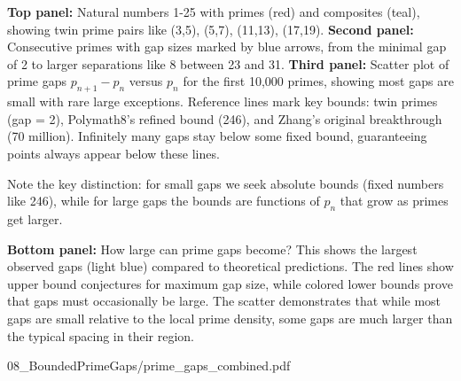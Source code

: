 \begin{SideNotePage}{

  \textbf{Top panel:} Natural numbers 1-25 with primes (red) and composites (teal), showing twin prime pairs like (3,5), (5,7), (11,13), (17,19).
  \newline
  \textbf{Second panel:} Consecutive primes with gap sizes marked by blue arrows, from the minimal gap of 2 to larger separations like 8 between 23 and 31.
  \newline
  \textbf{Third panel:} Scatter plot of prime gaps $p_{n+1} - p_n$ versus $p_n$ for the first 10,000 primes, showing most gaps are small with rare large exceptions. Reference lines mark key bounds: twin primes (gap = 2), Polymath8's refined bound (246), and Zhang's original breakthrough (70 million). Infinitely many gaps stay below some fixed bound, guaranteeing points always appear below these lines.
  
  Note the key distinction: for small gaps we seek absolute bounds (fixed numbers like 246), while for large gaps the bounds are functions of $p_n$ that grow as primes get larger.
  
  \textbf{Bottom panel:} How large can prime gaps become? This shows the largest observed gaps (light blue) compared to theoretical predictions. The red lines show upper bound conjectures for maximum gap size, while colored lower bounds prove that gaps must occasionally be large. The scatter demonstrates that while most gaps are small relative to the local prime density, some gaps are much larger than the typical spacing in their region.
}{08_BoundedPrimeGaps/prime_gaps_combined.pdf}
\end{SideNotePage}